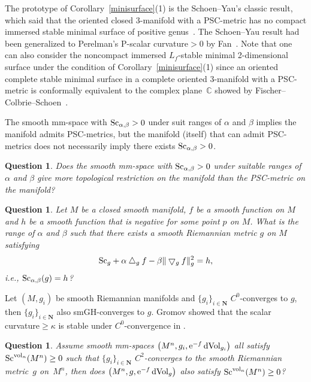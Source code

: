 \documentclass[pdftex]{sigma}
\newtheorem{Question}[Theorem]{Question}
\begin{document}
\begin{Remark}The prototype of Corollary~\ref{minisurface}(1) is the Schoen--Yau's classic result, which said that the oriented closed 3-manifold with a PSC-metric has no compact immersed stable minimal surface of positive genus~\cite{MR541332}. The Schoen--Yau result had been generalized to Perelman's P-scalar curvature${}>0$ by Fan~\cite{MR2407091}. Note that one can also consider the noncompact immersed $L_f$-stable minimal 2-dimensional surface under the condition of Corollary~\ref{minisurface}(1) since an oriented complete stable minimal surface in a complete oriented 3-manifold with a PSC-metric is conformally equivalent to the complex plane~$\mathbb{C}$ showed by Fischer--Colbrie--Schoen~\cite{MR562550}.
\end{Remark}

The smooth mm-space with ${\rm Sc}_{\alpha, \beta}>0$ under suit ranges of $\alpha$ and $\beta$ implies the manifold admits PSC-metrics, but the manifold (itself) that can admit PSC-metrics does not necessarily imply there exists ${\rm Sc}_{\alpha, \beta}>0$.
\begin{Question}Does the smooth mm-space with ${\rm Sc}_{\alpha, \beta}>0$ under suitable ranges of $\alpha$ and $\beta$ give more topological restriction on the manifold than the PSC-metric on the manifold?
\end{Question}

\begin{Question}Let $M$ be a closed smooth manifold, $f$ be a smooth function on $M$ and $h$ be a smooth function that is negative for some point $p$ on $M$. What is the range of $\alpha$ and $\beta$ such that there exists a smooth Riemannian metric $g$ on $M$ satisfying
 \begin{gather*}
 {\rm Sc}_g + \alpha\bigtriangleup_gf - \beta\|\bigtriangledown_gf\|_g^2=h,
 \end{gather*}
 i.e., ${\rm Sc}_{\alpha, \beta}(g)=h$?
\end{Question}

Let $(M, g_i)$ be smooth Riemannian manifolds and $\{g_i\}_{i\in \mathbf{N}}$ $C^0$-converges to $g$, then $\{g_i\}_{i\in \mathbf{N}}$ also smGH-converges to $g$. Gromov showed that the scalar curvature$\geq \kappa$ is stable under $C^0$-convergence in \cite[Section~1.8]{MR3201312}.

\begin{Question}Assume smooth mm-spaces $\big(M^n,g_i, {\rm e}^{-f}\,{\rm dVol}_{g_i}\big)$ all satisfy ${\rm Sc}^{{\rm vol}_n}(M^n)\geq 0$ such that $\{g_i\}_{i\in \mathbf{N}}$ $C^2$-converges to the smooth Riemannian metric~$g$ on~$M^n$, then does $\big(M^n,g, \allowbreak{\rm e}^{-f}\,{\rm dVol}_{g}\big)$ also satisfy ${\rm Sc}^{{\rm vol}_n}(M^n)\geq 0$?
\end{Question}
\end{document}
